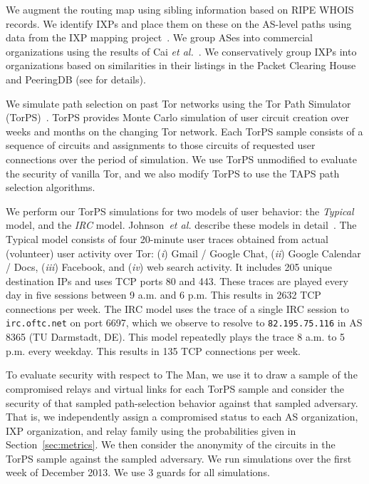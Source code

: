\documentclass[conference]{styles/IEEEtran}
\newcommand{\etal}{\emph{et al.}}
\newcommand{\ps}{TAPS\xspace}
\begin{document}
We augment the routing map using sibling information based on RIPE WHOIS records. We identify IXPs
and place them on these on the AS-level paths using data from the IXP mapping
project~\cite{Augustin-IMC2009}. We group ASes into commercial  organizations using the results of
Cai \etal~\cite{Cai12b}. We conservatively group IXPs into organizations based on similarities in
their listings in the Packet Clearing House and PeeringDB (see \cite{ccs2013-usersrouted} for
details).

We simulate path selection on past Tor networks using the Tor Path Simulator (TorPS)~\cite{ccs2013-usersrouted}. TorPS provides Monte Carlo simulation of user circuit creation
over weeks and months on the changing Tor network. Each TorPS sample consists of a sequence of
circuits and assignments to those circuits of requested user connections over the period of
simulation. We use TorPS unmodified to evaluate the security of
vanilla Tor, and we also modify TorPS to use the \ps path selection algorithms.

We perform our TorPS simulations for two models of user behavior: the \emph{Typical} model, and
the \emph{IRC} model. {Johnson~\etal} describe these models in detail~\cite{ccs2013-usersrouted}.
The Typical model consists of four 20-minute user traces obtained from actual (volunteer) user
activity over Tor: (\emph{i}) Gmail / Google Chat, (\emph{ii}) Google Calendar / Docs, (\emph{iii})
Facebook, and (\emph{iv}) web search activity. It includes 205 unique destination IPs and uses TCP
ports 80 and 443.  These traces are played every day in five sessions between
9 a.m. and 6 p.m. This results in 2632 TCP connections per week. The IRC model uses the trace of a
single IRC session to \texttt{irc.oftc.net} on port 6697, which we observe to resolve to \texttt{82.195.75.116} in AS 8365 (TU Darmstadt, DE). This model repeatedly plays the trace 8 a.m.
to 5 p.m. every weekday. This results in 135 TCP connections per week. 

To evaluate security with respect to \textsf{The Man}, we use it to draw a sample of the compromised
relays and virtual links for each TorPS
sample and consider the security of that sampled path-selection behavior against that sampled
adversary. That is, we independently assign a compromised status to each AS organization, IXP
organization, and relay family using the probabilities given in Section~\ref{sec:metrics}. We then
consider the anonymity of the circuits in the TorPS sample against the sampled adversary.
We run simulations over the first week of December 2013. We use 3 guards for all simulations.
\end{document}
